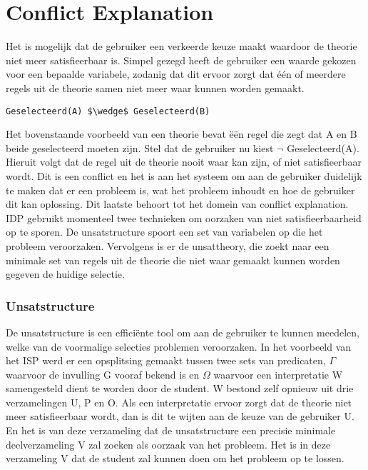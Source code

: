 \section{Conflict Explanation}
Het is mogelijk dat de gebruiker een verkeerde keuze maakt waardoor de theorie niet meer satisfieerbaar is. Simpel gezegd heeft de gebruiker een waarde gekozen voor een bepaalde variabele, zodanig dat dit ervoor zorgt dat \'{e}\'{e}n of meerdere regels uit de theorie samen niet meer waar kunnen worden gemaakt.

\begin{lstlisting}[mathescape]
Geselecteerd(A) $\wedge$ Geselecteerd(B)
\end{lstlisting}

Het bovenstaande voorbeeld van een theorie bevat \"{e}\"{e}n regel die zegt dat A en B beide geselecteerd moeten zijn. Stel dat de gebruiker nu kiest $\neg$ Geselecteerd(A). Hieruit volgt dat de regel uit de theorie nooit waar kan zijn, of niet satisfieerbaar wordt. Dit is een conflict en het is aan het systeem om aan de gebruiker duidelijk te maken dat er een probleem is, wat het probleem inhoudt en hoe de gebruiker dit kan oplossing. Dit laatste behoort tot het domein van conflict explanation. IDP gebruikt momenteel twee technieken om oorzaken van niet satisfieerbaarheid op te sporen. De unsatstructure spoort een set van variabelen op die het probleem veroorzaken. Vervolgens is er de unsattheory, die zoekt naar een minimale set van regels uit de theorie die niet waar gemaakt kunnen worden gegeven de huidige selectie.

\subsubsection{Unsatstructure}
De unsatstructure is een effici\"{e}nte tool om aan de gebruiker te kunnen meedelen, welke van de voormalige selecties problemen veroorzaken. In het voorbeeld van het ISP werd er een opsplitsing gemaakt tussen twee sets van predicaten, $\Gamma$ waarvoor de invulling G vooraf bekend is en $\Omega$ waarvoor een interpretatie W samengesteld dient te worden door de student. W bestond zelf opnieuw uit drie verzamelingen U, P en O. Als een interpretatie ervoor zorgt dat de theorie niet meer satisfieerbaar wordt, dan is dit te wijten aan de keuze van de gebruiker U. En het is van deze verzameling dat de unsatstructure een precisie minimale deelverzameling V zal zoeken als oorzaak van het probleem. Het is in deze verzameling V dat de student zal kunnen doen om het probleem op te lossen. 


